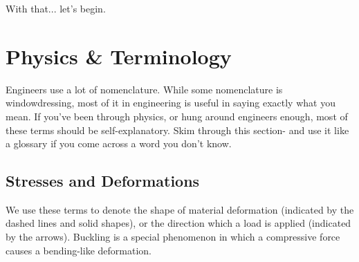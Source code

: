 With that... let's begin.

\chapter{Physics \& Terminology}

Engineers use a lot of nomenclature. While some nomenclature is windowdressing, most of it in engineering is useful in saying exactly what you mean. If you've been through physics, or hung around engineers enough, most of these terms should be self-explanatory. Skim through this section- and use it like a glossary if you come across a word you don't know.

\section{Stresses and Deformations}
We use these terms to denote the shape of material deformation (indicated by the dashed lines and solid shapes), or the direction which a load is applied (indicated by the arrows). Buckling is a special phenomenon in which a compressive force causes a bending-like deformation.
